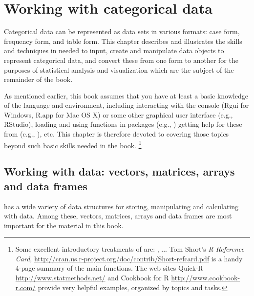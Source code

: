 \documentclass[11pt]{book}
\begin{document}
\chapter{Working with categorical data}\label{ch:working}


Categorical data can be represented as data sets
in various formats:
case form, frequency form, and table form.  This chapter
describes and illustrates the skills and techniques in \R
needed to input, create and manipulate \R data objects
to represent categorical data, and convert these from one
form to another for the purposes of statistical analysis
and visualization which are the subject of the remainder of the book.

As mentioned earlier, this book assumes that you have at least a
basic knowledge of the \R language and environment, including
interacting with the \R console (Rgui for Windows, R.app for Mac OS X)
or some other graphical user interface (e.g., RStudio),
loading and using \R functions in packages (e.g., )
getting help for these from \R (e.g., ), etc.
This chapter is therefore devoted
to covering those topics beyond such basic skills needed in the book.%
\footnote{
Some excellent introductory treatments of \R are:
\citet[]{FoxWeisberg:2011}, ...
Tom Short's \emph{R Reference Card}, \url{http://cran.us.r-project.org/doc/contrib/Short-refcard.pdf} is a handy 4-page summary of the main functions.
The web sites
Quick-R \url{http://www.statmethods.net/} and
Cookbook for R \url{http://www.cookbook-r.com/}
provide very helpful examples, organized by topics and tasks.
}


\section{Working with \R data: vectors, matrices, arrays and data frames}\label{sec:Rdata}

\R has a wide variety of data structures for storing, manipulating and
calculating with data.  Among these, vectors, matrices, arrays and
data frames are most important for the material in this book. 
\end{document}
